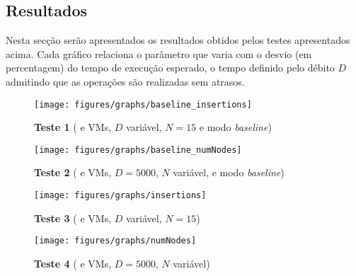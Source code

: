 
\subsection{Resultados}

Nesta secção serão apresentados os resultados obtidos pelos testes apresentados acima. 
Cada gráfico relaciona o parâmetro que varia com o desvio (em percentagem) do tempo de execução esperado,
\ie o tempo definido pelo débito $D$ admitindo que as operações são realizadas sem atrasos.

	
\begin{figure}[h!]
	\centering
	\texttt{[image: figures/graphs/baseline\_insertions]}
	\caption{\textbf{Teste 1} ({\conts} e VMs, $D$ variável, $N = 15$ e modo \textit{baseline})}
	\label{fig:results-ins-baseline}
\end{figure}

\begin{figure}[h!]
	\centering
	\texttt{[image: figures/graphs/baseline\_numNodes]}
	\caption{\textbf{Teste 2} ({\conts} e VMs, $D = 5000$, $N$ variável, e modo \textit{baseline})}
	\label{fig:results-nos-baseline}
\end{figure}

\begin{figure}[h!]
	\centering
	\texttt{[image: figures/graphs/insertions]}
	\caption{\textbf{Teste 3} ({\conts} e VMs, $D$ variável, $N = 15$)}
	\label{fig:results-insertions}
\end{figure}

\begin{figure}[h!]
	\centering
	\texttt{[image: figures/graphs/numNodes]}
	\caption{\textbf{Teste 4} ({\conts} e VMs, $D = 5000$, $N$ variável)}
	\label{fig:results-nos}
\end{figure}




